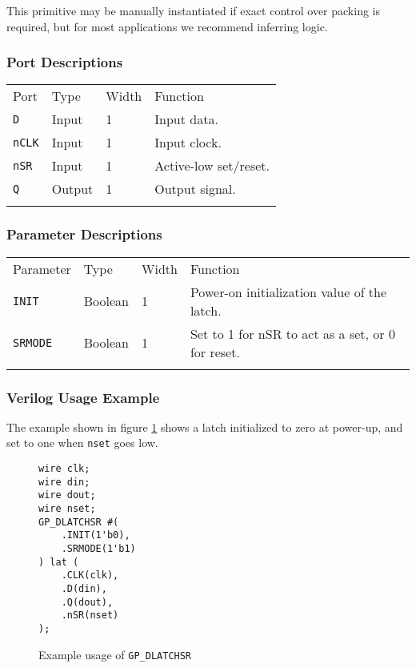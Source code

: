 \documentclass[11pt]{article}
\newcommand{\tokenstyle}[1]{\texttt{#1}}
\newcommand{\wirestyle}[1]{\texttt{#1}}
\newcommand{\whenstyle}[1]{{\fontseries{sb}\selectfont#1}}
\newcommand{\thinhline}{\Xhline{1\arrayrulewidth}}
\newcommand{\thickhline}{\Xhline{2.5\arrayrulewidth}}
\begin{document}
This primitive may be manually instantiated if exact control over packing is required, but for most applications we
recommend inferring logic.

\subsubsection{Port Descriptions}

\begin{tabularx}{\textwidth}{lllX}
\thinhline
\whenstyle{Port} & \whenstyle{Type} & \whenstyle{Width} & \whenstyle{Function} \\
\thickhline
\tokenstyle{D} & Input & 1 & Input data. \\
\thinhline
\tokenstyle{nCLK} & Input & 1 & Input clock. \\
\thinhline
\tokenstyle{nSR} & Input & 1 & Active-low set/reset. \\
\thinhline
\tokenstyle{Q} & Output & 1 & Output signal. \\
\thinhline
\end{tabularx}

\subsubsection{Parameter Descriptions}

\begin{tabularx}{\textwidth}{lllX}
\thinhline
\whenstyle{Parameter} & \whenstyle{Type} & \whenstyle{Width} & \whenstyle{Function} \\
\thickhline
\tokenstyle{INIT} & Boolean & 1 & Power-on initialization value of the latch.\\
\thinhline
\tokenstyle{SRMODE} & Boolean & 1 & Set to 1 for nSR to act as a set, or 0 for reset. \\
\thinhline
\end{tabularx}

\subsubsection{Verilog Usage Example}

The example shown in figure \ref{gp-dlatchsr-example} shows a latch initialized to zero at power-up, and set to one
when \wirestyle{nset} goes low.

\begin{figure}[h]
\begin{lstlisting}
wire clk;
wire din;
wire dout;
wire nset;
GP_DLATCHSR #(
	.INIT(1'b0),
	.SRMODE(1'b1)
) lat (
	.CLK(clk),
	.D(din),
	.Q(dout),
	.nSR(nset)
);
\end{lstlisting}
\caption{Example usage of \tokenstyle{GP\_DLATCHSR}}
\label{gp-dlatchsr-example}
\end{figure}
\end{document}
